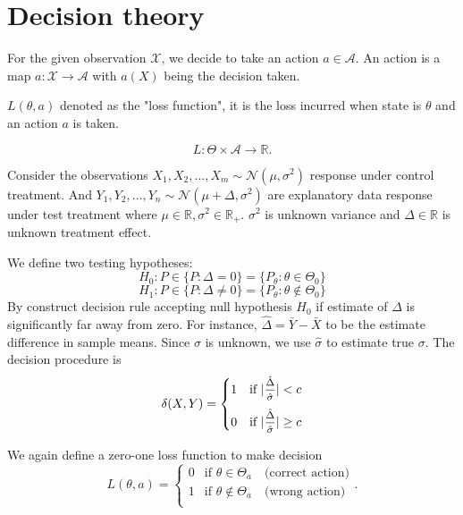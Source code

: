 \chapter{Decision theory}

For the given observation $\mathcal{X}$, we decide to take an action $a \in \mathcal{A}$.
An action is a map $a : \mathcal{X} \to \mathcal{A}$ with $a(X)$ being the decision taken.

$L(\theta, a)$ denoted as the "loss function", it is the loss incurred when state is $\theta$ 
and an action $a$ is taken.

\begin{equation}
    L : \Theta \times \mathcal{A} \to \mathbb{R}.
\end{equation}

\begin{example}
    Consider the observations $X_1, X_2, \ldots, X_m \sim \mathcal{N}(\mu, \sigma^2)$ response 
    under control treatment. And $Y_1, Y_2, \ldots, Y_n \sim \mathcal{N}(\mu + \Delta, \sigma^2)$
    are explanatory data response under test treatment where $\mu \in \mathbb{R}, \sigma^2 \in \mathbb{R}_+$.
    $\sigma^2$ is unknown variance and $\Delta \in \mathbb{R}$ is unknown treatment effect.

    We define two testing hypotheses:
    \[
        H_0 : P \in \{ P : \Delta = 0 \} = \{ P_\theta : \theta \in \Theta_0 \}
    \]
    \[
        H_1 : P \in \{ P : \Delta \neq 0 \} = \{ P_\theta : \theta \notin \Theta_0 \}
    \]
    By construct decision rule accepting null hypothesis $H_0$ if estimate of $\Delta$ 
    is significantly far away from zero. For instance, $\hat{\Delta} = \bar{Y} - \bar{X}$ to be 
    the estimate difference in sample means. Since $\sigma$ is unknown, we use $\hat{\sigma}$ to estimate 
    true $\sigma$. The decision procedure is 
    \[
        \delta(X,Y) = \begin{cases}
            1 & \text{if } |\mfrac{\hat{\Delta}}{\hat{\sigma}}| < c\\[0.8em]
            0 & \text{if } |\mfrac{\hat{\Delta}}{\hat{\sigma}}| \geq c
        \end{cases}
    \]

    We again define a zero-one loss function to make decision 
    \begin{equation*}
        L(\theta, a) = \begin{cases}
            0 & \text{if } \theta \in \Theta_a \quad \text{(correct action)}\\
            1 & \text{if } \theta \notin \Theta_a \quad \text{(wrong action)}\\
        \end{cases}.
    \end{equation*}


\end{example}
